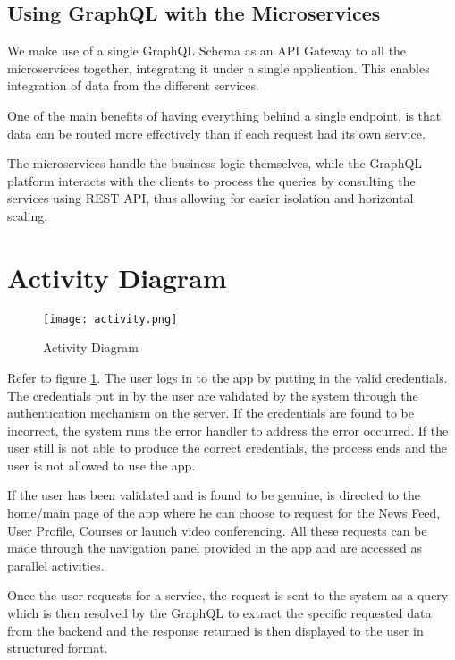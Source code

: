 \subsection{Using GraphQL with the Microservices}

We make  use of a single GraphQL Schema as an API Gateway to all the microservices together, 
integrating it under a single application. This enables integration of data from the different services.

One of the main benefits of having everything behind a single endpoint, is that data can be routed more 
effectively than if each request had its own service. 

The microservices handle the business logic themselves, while the GraphQL platform interacts with the 
clients to process the queries by consulting the services using REST API, thus allowing for easier isolation 
and horizontal scaling.

\section{Activity Diagram}

\begin{figure}[h!]
    \begin{center}
        \texttt{[image: activity.png]}
    \end{center}
    \caption{Activity Diagram}
    \label{fig:activity}
\end{figure}

Refer to figure \ref{fig:activity}. The user logs in to the app by putting in the valid credentials.
The credentials put in by the user are validated by the system through the authentication mechanism on the server.
If the credentials are found to be incorrect, the system runs the error handler to address the error occurred.
If the user still is not able to produce the correct credentials, the process ends and the user is not allowed to use the app.

If the user has been validated and is found to be genuine, is directed to the home/main page of the app where he can choose to request for the News Feed, User Profile, Courses or launch video conferencing.
All these requests can be made through the navigation panel provided in the app and are accessed as parallel activities.

Once the user requests for a service, the request is sent to the system as a query which is then resolved by the GraphQL to extract the specific requested data from the backend and the response returned is then displayed to the user in structured format.

